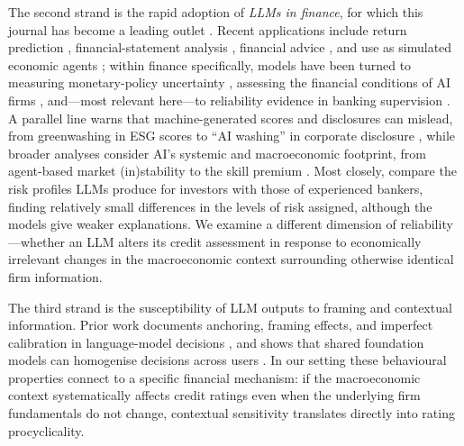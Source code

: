 \documentclass[a4paper,fleqn]{cas-sc}
\begin{document}
The second strand is the rapid adoption of \emph{LLMs in finance}, for which this journal has become a
leading outlet \citep{ali2025}. Recent applications include return prediction \citep{lopezlira2023},
financial-statement analysis \citep{kim2024}, financial advice \citep{fieberg2025,kirschbaum2026}, and
use as simulated economic agents \citep{horton2023}; within finance specifically, models have been
turned to measuring monetary-policy uncertainty \citep{ito2025}, assessing the financial conditions of
AI firms \citep{giaretta2026}, and---most relevant here---to reliability evidence in banking
supervision \citep{garcia2026}. A parallel line warns that machine-generated scores and disclosures
can mislead, from greenwashing in ESG scores \citep{kathan2025} to ``AI washing'' in corporate
disclosure \citep{song2026}, while broader analyses consider AI's systemic and macroeconomic
footprint, from agent-based market (in)stability \citep{llacay2026} to the skill premium
\citep{bloom2025}. Most closely, \citet{hens2025} compare the risk profiles LLMs produce for investors
with those of experienced bankers, finding relatively small differences in the levels of risk
assigned, although the models give weaker explanations. We examine a different dimension of
reliability---whether an LLM alters its credit assessment in response to economically irrelevant
changes in the macroeconomic context surrounding otherwise identical firm information.

The third strand is the susceptibility of LLM outputs to framing and contextual information. Prior
work documents anchoring, framing effects, and imperfect calibration in language-model decisions
\citep{tversky1974,tversky1981,binz2023,kadavath2022}, and shows that shared foundation models can
homogenise decisions across users \citep{bommasani2022}. In our setting these behavioural properties
connect to a specific financial mechanism: if the macroeconomic context systematically affects credit
ratings even when the underlying firm fundamentals do not change, contextual sensitivity translates
directly into rating procyclicality.
\end{document}
